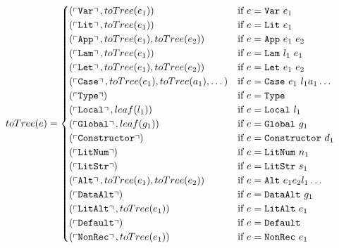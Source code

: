 \begin{figure}
  \begin{align*}
    toTree(e) &=
    \begin{cases}
      (\left\ulcorner \texttt{Var} \right\urcorner,     toTree(e_1))                                 & \text{if $e = \texttt{Var}\ e_1$} \\
      (\left\ulcorner \texttt{Lit} \right\urcorner,     toTree(e_1))                                 & \text{if $e = \texttt{Lit}\ e_1$} \\
      (\left\ulcorner \texttt{App} \right\urcorner,     toTree(e_1), toTree(e_2))                    & \text{if $e = \texttt{App}\ e_1\ e_2$} \\
      (\left\ulcorner \texttt{Lam} \right\urcorner,     toTree(e_1))                                 & \text{if $e = \texttt{Lam}\ l_1\ e_1$} \\
      (\left\ulcorner \texttt{Let} \right\urcorner,     toTree(e_1), toTree(e_2))                    & \text{if $e = \texttt{Let}\ e_1\ e_2$} \\
      (\left\ulcorner \texttt{Case} \right\urcorner,    toTree(e_1), toTree(a_1), \dots)             & \text{if $e = \texttt{Case}\ e_1\ l_1 a_1 \dots$} \\
      (\left\ulcorner \texttt{Type} \right\urcorner)                                                & \text{if $e = \texttt{Type}$} \\
      (\left\ulcorner \texttt{Local} \right\urcorner,   leaf(l_1))                                  & \text{if $e = \texttt{Local}\ l_1$} \\
      (\left\ulcorner \texttt{Global} \right\urcorner,  leaf(g_1))                                  & \text{if $e = \texttt{Global}\ g_1$} \\
      (\left\ulcorner \texttt{Constructor} \right\urcorner)                                         & \text{if $e = \texttt{Constructor}\ d_1$} \\
      (\left\ulcorner \texttt{LitNum} \right\urcorner)                                              & \text{if $e = \texttt{LitNum}\ n_1$} \\
      (\left\ulcorner \texttt{LitStr} \right\urcorner)                                              & \text{if $e = \texttt{LitStr}\ s_1$} \\
      (\left\ulcorner \texttt{Alt} \right\urcorner,     toTree(e_1), toTree(e_2))                   & \text{if $e = \texttt{Alt}\ e_1 e_2 l_1 \dots$}  \\
      (\left\ulcorner \texttt{DataAlt} \right\urcorner)                                             & \text{if $e = \texttt{DataAlt}\ g_1$}  \\
      (\left\ulcorner \texttt{LitAlt} \right\urcorner,  toTree(e_1))                                & \text{if $e = \texttt{LitAlt}\ e_1$}  \\
      (\left\ulcorner \texttt{Default} \right\urcorner)                                             & \text{if $e = \texttt{Default}$}  \\
      (\left\ulcorner \texttt{NonRec} \right\urcorner,  toTree(e_1))                                & \text{if $e = \texttt{NonRec}\ e_1$}  \\

\end{cases}
\end{align*}
\end{figure}
